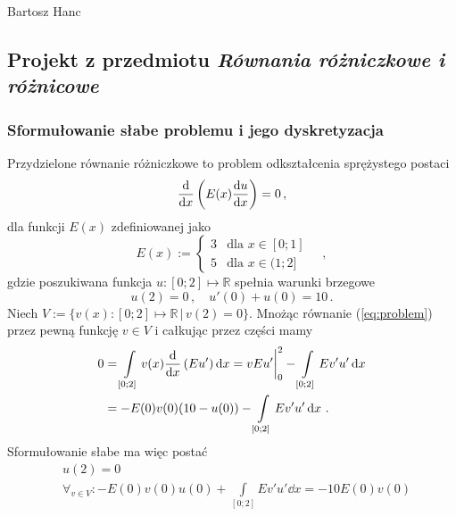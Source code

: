 \documentclass{myclass}
\begin{document}
\begin{flushright}
    Bartosz Hanc
\end{flushright}

\subsection*{Projekt z przedmiotu \textit{Równania różniczkowe i różnicowe}}

\subsubsection*{Sformułowanie słabe problemu i jego dyskretyzacja}

Przydzielone równanie różniczkowe to problem odkształcenia sprężystego postaci
\begin{equation}\label{eq:problem}
    \dv{}{x}\left(E(x)\dv{u}{x}\right) = 0\,,
\end{equation}
dla funkcji \(E(x)\) zdefiniowanej jako
\begin{equation}
    E(x) := \begin{cases}
        3&\text{dla \(x\in[0;1]\)}\\
        5&\text{dla \(x\in(1;2]\)}
    \end{cases}\quad,
\end{equation}
gdzie poszukiwana funkcja \(u:[0;2]\mapsto\mathbb{R}\) spełnia warunki brzegowe
\begin{equation}
    u(2) = 0\,,\quad u'(0)+u(0) = 10\,.
\end{equation}
Niech \(V := \{v(x):[0;2]\mapsto\mathbb{R}\, | \, v(2) = 0\}\). Mnożąc równanie
(\ref{eq:problem}) przez pewną funkcję \(v\in V\) i całkując przez części mamy
\begin{equation}
    \begin{split}
        0 & = \int\limits_{[0;2]} v(x)\dv{}{x}\left(Eu'\right)\dd{x} =vEu'\bigg|_0^2 - \int\limits_{[0;2]} Ev'u'\dd{x} \\ 
        & = -E(0)v(0)(10-u(0)) - \int\limits_{[0;2]} Ev'u'\dd{x}\,.
    \end{split}
\end{equation}
Sformułowanie słabe ma więc postać
\begin{equation}\label{eq:weak}
    \begin{split}
        &u(2) = 0 \\
        &\forall_{v\in V}:-E(0)v(0)u(0) + \int\limits_{[0;2]} Ev'u'\dd{x} = -10E(0)v(0)
    \end{split}
\end{equation}
\end{document}
